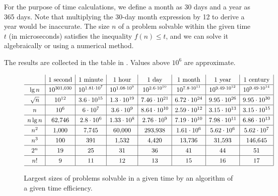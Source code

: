 For the purpose of time calculations, we define a month as 30 days and a year as 365 days.
Note that multiplying the 30-day month expression by 12 to derive a year would be inaccurate.
The size $n$ of a problem solvable within the given time $t$ (in microseconds) satisfies the inequality $f(n)\le t$, and we can solve it algebraically or using a numerical method.

The results are collected in the table in .
Values above $10^6$ are approximate.

\begin{figure}[htb]
    \[
        \renewcommand{\arraystretch}{1.3}
        \begin{array}{c|c|c|c|c|c|c|c|}
            & \text{1 second} & \text{1 minute} & \text{1 hour} & \text{1 day} & \text{1 month} & \text{1 year} & \text{1 century} \\
            \hline
            \lg n & 10^{301{,}030} & 10^{1.81\cdot10^7} & 10^{1.08\cdot10^9} & 10^{2.6\cdot10^{10}} & 10^{7.8\cdot10^{11}} & 10^{9.49\cdot10^{12}} & 10^{9.49\cdot10^{14}} \\
            \hline
            \sqrt{n} & 10^{12} & 3.6\cdot10^{15} & 1.3\cdot10^{19} & 7.46\cdot10^{21} & 6.72\cdot10^{24} & 9.95\cdot10^{26} & 9.95\cdot10^{30} \\
            \hline
            n & 10^6 & 6\cdot10^7 & 3.6\cdot10^9 & 8.64\cdot10^{10} & 2.59\cdot10^{12} & 3.15\cdot10^{13} & 3.15\cdot10^{15} \\
            \hline
            n\lg n & 62{,}746 & 2.8\cdot10^6 & 1.33\cdot10^8 & 2.76\cdot10^9 & 7.19\cdot10^{10} & 7.98\cdot10^{11} & 6.86\cdot10^{13} \\
            \hline
            n^2 & 1{,}000 & 7{,}745 & 60{,}000 & 293{,}938 & 1.61\cdot10^6 & 5.62\cdot10^6 & 5.62\cdot10^7 \\
            \hline
            n^3 & 100 & 391 & 1{,}532 & 4{,}420 & 13{,}736 & 31{,}593 & 146{,}645 \\
            \hline
            2^n & 19 & 25 & 31 & 36 & 41 & 44 & 51 \\
            \hline
            n! & 9 & 11 & 12 & 13 & 15 & 16 & 17 \\
            \hline
        \end{array}
    \]
    \caption{Largest sizes of problems solvable in a given time by an algorithm of a given time efficiency.} \label{fig:1-1}
\end{figure}
